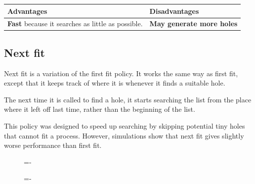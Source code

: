 \documentclass[a4paper]{systems-software}
\begin{document}
\begin{longtabu} to \textwidth {| X[1,l] | X[1,l] |}
    \hline
    \textbf{Advantages} & \textbf{Disadvantages}
	\\ \hline
	\textbf{Fast} because it searches as little as possible. &
	\textbf{May generate more holes}
	\\ \hline
\end{longtabu}


\newpage

\subsection*{Next fit}

Next fit is a variation of the first fit policy. It works the same way as first fit, except that it keeps track of where it is whenever it finds a suitable hole.

The next time it is called to find a hole, it starts searching the list from the place where it left off last time, rather than the beginning of the list.

This policy was designed to speed up searching by skipping potential tiny holes that cannot fit a process. However, simulations show that next fit gives slightly worse performance than first fit.

\begin{figure}[H]
  \lineskip=-\fboxrule
\end{figure}

\begin{figure}[H]
  \lineskip=-\fboxrule
\end{figure}
\end{document}

